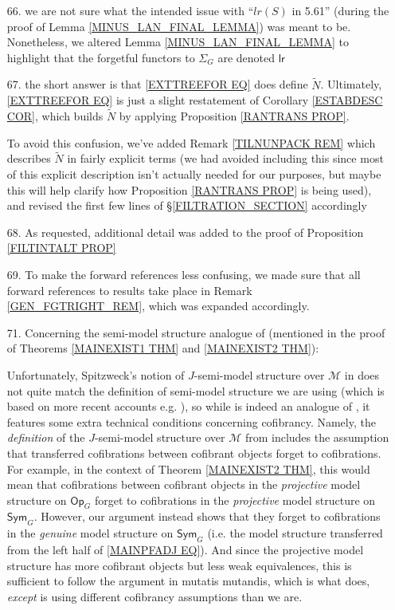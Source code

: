 \documentclass{article}
\begin{document}
\begin{itemize}
	\item[66.] we are not sure what the intended issue with 
	``$lr(S)$ in 5.61'' 
	(during the proof of Lemma \ref{MINUS_LAN_FINAL_LEMMA})
	was meant to be.
	Nonetheless, we altered 
	Lemma \ref{MINUS_LAN_FINAL_LEMMA}
	to highlight that the forgetful functors to $\Sigma_G$
	are denoted $\mathsf{lr}$
	
	\item[67.] the short answer is that \eqref{EXTTREEFOR EQ} does define $\tilde{N}$.
	Ultimately, \eqref{EXTTREEFOR EQ} is just a slight restatement of Corollary \ref{ESTABDESC COR}, which builds 
	$\tilde{N}$ by applying Proposition \ref{RANTRANS PROP}.
	
	To avoid this confusion,
	we've added Remark \ref{TILNUNPACK REM} 
	which describes $\tilde{N}$ in fairly explicit terms
	(we had avoided including this since most of this explicit description isn't actually needed for our purposes,
	but maybe this will help clarify how 
	Proposition \ref{RANTRANS PROP} is being used),
	and revised the first few lines of 
	\S \ref{FILTRATION_SECTION} accordingly	

	
	\item[68.] As requested, additional detail was added to the proof of
	Proposition \ref{FILTINTALT PROP}

	\item[69.]
	To make the forward references less confusing, 
	we made sure that all forward references to results take place in
	Remark \ref{GEN_FGTRIGHT_REM},
	which was expanded accordingly.

	\item[71.] 
	Concerning the semi-model structure analogue of
	\cite[Thm. 11.3.2]{Hi03}
	(mentioned in the proof of Theorems \ref{MAINEXIST1 THM} and \ref{MAINEXIST2 THM}):
	
	Unfortunately, Spitzweck's notion
	of $J$-semi-model structure over $\mathcal M$ in \cite{Spi01}
	does not quite match the definition
	of semi-model structure
	we are using
	(which is based on more recent accounts e.g. \cite{Fre09,WY18}),
	so while \cite[Thm. 2]{Spi01}
	is indeed an analogue of \cite[Thm. 11.3.2]{Hi03},
	it features some extra technical conditions concerning cofibrancy.
	Namely, the \emph{definition} of the $J$-semi-model structure over $\mathcal M$ from \cite{Spi01}
	includes the assumption
	that transferred cofibrations between cofibrant objects forget to cofibrations.
	For example,
	in the context of Theorem \ref{MAINEXIST2 THM},
	this would mean that cofibrations between cofibrant objects in the \emph{projective} 
	model structure on $\mathsf{Op}_G$
	forget to cofibrations in the 
	\emph{projective} 
	model structure on $\mathsf{Sym}_G$.
	However, our argument instead shows that they forget to 
	cofibrations in the \emph{genuine} 
	model structure on $\mathsf{Sym}_G$
	(i.e. the model structure transferred from the left half of \eqref{MAINPFADJ EQ}).
	And since the projective model structure has more cofibrant objects but less weak equivalences, 
	this is sufficient to follow the argument in 
	\cite[Thm. 11.3.2]{Hi03} mutatis mutandis,
	which is what \cite[Thm. 2]{Spi01} does,
	\emph{except} \cite[Thm. 2]{Spi01}
	is using different cofibrancy assumptions than we are.


\end{itemize}
\end{document}
